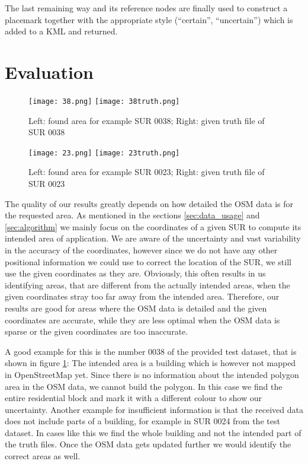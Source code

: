\documentclass[11pt,fleqn]{book} %
\begin{document}
The last remaining way and its reference nodes are finally used to construct a placemark together with the appropriate style (``certain'', ``uncertain'') which is added to a KML and returned.

\section{Evaluation}\label{sec:evaluation}
\begin{figure}[h]
\texttt{[image: 38.png]}
\texttt{[image: 38truth.png]}
\caption{Left: found area for example SUR 0038; Right: given truth file of SUR 0038}
\label{fic:38}
\end{figure}
\begin{figure}
\texttt{[image: 23.png]}
\texttt{[image: 23truth.png]}
\caption{Left: found area for example SUR 0023; Right: given truth file of SUR 0023}
\label{fic:23}
\end{figure}

The quality of our results greatly depends on how detailed the OSM data is for the requested area. As mentioned in the sections \ref{sec:data_usage} and \ref{sec:algorithm} we mainly focus on the coordinates of a given SUR to compute its intended area of application. We are aware of the uncertainty and vast variability in the accuracy of the coordinates, however since we do not have any other positional information we could use to correct the location of the SUR, we still use the given coordinates as they are. Obviously, this often results in us identifying areas, that are different from the actually intended areas, when the given coordinates stray too far away from the intended area. Therefore, our results are good for areas where the OSM data is detailed and the given coordinates are accurate, while they are less optimal when the OSM data is sparse or the given coordinates are too inaccurate. 

A good example for this is the number 0038 of the provided test dataset, that is shown in figure \ref{fic:38}: The intended area is a building which is however not mapped in OpenStreetMap yet. Since there is no information about the intended polygon area in the OSM data, we cannot build the polygon. In this case we find the entire residential block and mark it with a different colour to show our uncertainty. Another example for insufficient information is that the received data does not include parts of a building, for example in SUR 0024 from the test dataset. In cases like this we find the whole building and not the intended part of the truth files. Once the OSM data gets updated further we would identify the correct areas as well.
\end{document}
